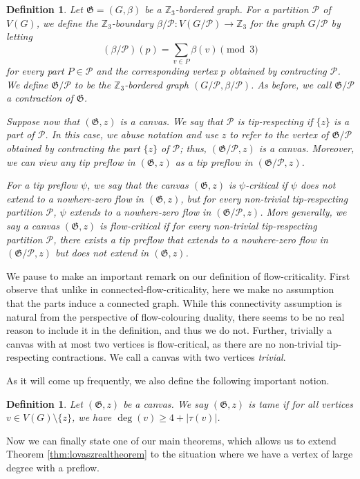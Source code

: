 \documentclass{article}
\newcommand{\Z}{\mathbb{Z}_3}
\newcommand{\PP}{\mathcal{P}}
\newcommand\g{\mathfrak{G}}
\newtheorem{definition}[theorem]{Definition}
\begin{document}
\begin{definition}
Let $\g=(G,\beta)$ be a $\Z$-bordered graph. For a partition $\PP$ of $V(G)$, we
define the $\Z$-boundary $\beta / \PP:V(G/\PP)\to\Z$ for the graph $G/\PP$ by
letting 
$$(\beta / \PP)(p) = \sum_{ v \in P} \beta(v) \pmod 3$$
for every part $P\in\PP$ and the corresponding vertex $p$ obtained by contracting $\PP$.
We define $\g / \PP$ to be the $\Z$-bordered graph $(G/ \PP, \beta / \PP)$.
As before, we call $\g / \PP$ a \emph{contraction} of $\g$.

Suppose now that $(\g,z)$ is a canvas.
We say that $\PP$ is \emph{tip-respecting} if $\{z\}$ is a part of $\PP$.
In this case, we abuse notation and use $z$ to refer to the vertex of $\g/\PP$ obtained by
contracting the part $\{z\}$ of $\PP$; thus, $(\g/\PP, z)$ is a canvas.
Moreover, we can view any tip preflow in $(\g,z)$ as a tip preflow in $(\g / \PP,z)$.

For a tip preflow $\psi$, we say that the canvas $(\g,z)$ is \emph{$\psi$-critical} if $\psi$ does
not extend to a nowhere-zero flow in $(\g,z)$, but for every non-trivial
tip-respecting partition $\PP$, $\psi$ extends to a nowhere-zero flow
in $(\g / \PP,z)$. More generally, we say a canvas $(\g,z)$ is
\emph{flow-critical} if for every non-trivial tip-respecting partition
$\PP$, there exists a tip preflow that extends to a nowhere-zero flow
in $(\g / \PP,z)$ but does not extend in $(\g,z)$.
\end{definition}

We pause to make an important remark on our definition of flow-criticality.
First observe that unlike in connected-flow-criticality, here we make no
assumption that the parts induce a connected graph. While this connectivity
assumption is natural from the perspective of flow-colouring duality, there
seems to be no real reason to include it in the definition, and thus we do not.
Further, trivially a canvas with at most two vertices is flow-critical, as
there are no non-trivial tip-respecting contractions. We call a canvas with two
vertices \textit{trivial}.

As it will come up frequently, we also define the following important notion.

\begin{definition}
 Let $(\g,z)$ be a canvas. We say $(\g,z)$  is \emph{tame} if for all vertices $v \in V(G) \setminus \{z\}$, we have $\deg(v) \geq 4 + |\tau(v)|$. 
\end{definition}

Now we can finally state one of our main theorems, which allows us to extend Theorem \ref{thm:lovaszrealtheorem} to the situation where we have a vertex of large degree with a preflow.
\end{document}
